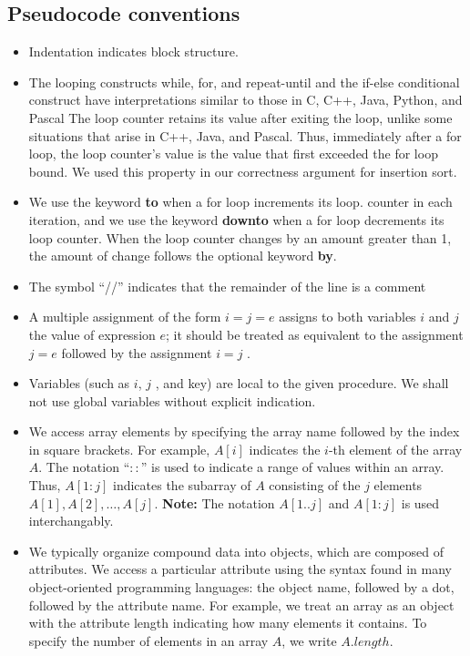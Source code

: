 \documentclass{report}
\begin{document}
    \subsection{Pseudocode conventions}
    \begin{itemize}
        \item Indentation indicates block structure.
        \item The looping constructs while, for, and repeat-until and the if-else conditional construct have interpretations similar to those in C, C++, Java, Python, and Pascal
            \bigbreak \noindent 
            The loop counter retains its value after exiting the loop, unlike some situations that arise in C++, Java, and Pascal. Thus, immediately after a for loop, the loop counter’s value is the value that first exceeded the for loop bound. We used this property in our correctness argument for insertion sort.
        \item We use the keyword \textbf{to} when a for loop increments its loop. counter in each iteration, and we use the keyword \textbf{downto} when a for loop decrements its loop counter. When the loop counter changes by an amount greater than 1, the amount of change follows the optional keyword \textbf{by}.
        \item The symbol “//” indicates that the remainder of the line is a comment
        \item A multiple assignment of the form $i = j = e$ assigns to both variables $i$ and $j$ the value of expression $e$; it should be treated as equivalent to the assignment $j = e$ followed by the assignment $i = j$ .
        \item Variables (such as $i$, $j$ , and key) are local to the given procedure. We shall not use global variables without explicit indication.
        \item We access array elements by specifying the array name followed by the index in square brackets. For example, \( A[i] \) indicates the \( i \)-th element of the array \( A \). The notation ``\(: :\)'' is used to indicate a range of values within an array. Thus, \( A[1 : j] \) indicates the subarray of \( A \) consisting of the \( j \) elements \( A[1], A[2], \dots, A[j] \).
            \bigbreak \noindent 
            \textbf{Note:} The notation $A[1..j]$ and $A[1:j]$ is used interchangably.
        \item We typically organize compound data into objects, which are composed of attributes. We access a particular attribute using the syntax found in many object-oriented programming languages: the object name, followed by a dot, followed by the attribute name. For example, we treat an array as an object with the attribute length indicating how many elements it contains. To specify the number of elements in an array $A$, we write $A.length$.

\end{itemize}
\end{document}

